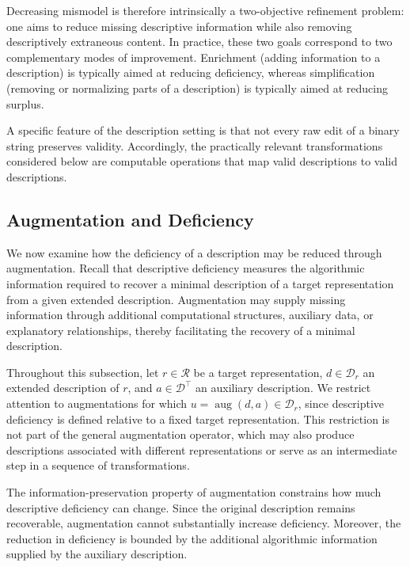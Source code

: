 Decreasing mismodel is therefore intrinsically a two-objective refinement problem: one aims to reduce missing descriptive information while also removing descriptively extraneous content. In practice, these two goals correspond to two complementary modes of improvement. Enrichment (adding information to a description) is typically aimed at reducing deficiency, whereas simplification (removing or normalizing parts of a description) is typically aimed at reducing surplus.

A specific feature of the description setting is that not every raw edit of a binary string preserves validity. Accordingly, the practically relevant transformations considered below are computable operations that map valid descriptions to valid descriptions.


\subsection*{Augmentation and Deficiency}

We now examine how the deficiency of a description may be reduced through augmentation. Recall that descriptive deficiency measures the algorithmic information required to recover a minimal description of a target representation from a given extended description. Augmentation may supply missing information through additional computational structures, auxiliary data, or explanatory relationships, thereby facilitating the recovery of a minimal description.

Throughout this subsection, let $r\in\mathcal R$ be a target representation, $d\in\mathcal D_r$ an extended description of $r$, and $a\in\mathcal D^\top$ an auxiliary description. We restrict attention to augmentations for which $u=\operatorname{aug}(d,a)\in\mathcal D_r$, since descriptive deficiency is defined relative to a fixed target representation. This restriction is not part of the general augmentation operator, which may also produce descriptions associated with different representations or serve as an intermediate step in a sequence of transformations.

The information-preservation property of augmentation constrains how much descriptive deficiency can change. Since the original description remains recoverable, augmentation cannot substantially increase deficiency. Moreover, the reduction in deficiency is bounded by the additional algorithmic information supplied by the auxiliary description.

